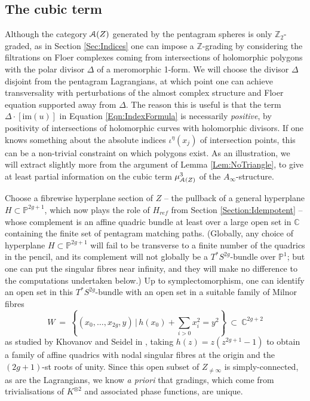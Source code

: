 \documentclass[reqno,10pt]{amsart}
\numberwithin{equation}{section}
\newcommand{\bC}{{\mathbb C}}
\newcommand{\bP}{{\mathbb P}}
\newcommand{\bZ}{{\mathbb Z}}
\newcommand{\scrA}{\EuScript{A}}
\newcommand{\im}{\mathrm{im}}
\theoremstyle{remark}
\begin{document}
\subsection{The cubic term\label{Sec:Cubic}}

 Although the category $\scrA(Z)$ generated by the pentagram spheres is only $\bZ_2$-graded, as in Section \ref{Sec:Indices} one can impose a $\bZ$-grading by considering the filtrations on Floer complexes coming from intersections of holomorphic polygons with the polar divisor $\Delta$ of a meromorphic 1-form.  We will choose the divisor $\Delta$ disjoint from the pentagram Lagrangians, at which point one can achieve transversality with perturbations of the almost complex structure and Floer equation supported away from $\Delta$.  The reason this is useful is that the term $\Delta \cdot [\im(u)]$ in Equation \ref{Eqn:IndexFormula} is necessarily \emph{positive}, by positivity of intersections of holomorphic curves with holomorphic divisors. If one knows something about the absolute indices $\iota^{\eta}(x_j)$ of intersection points, this can be a non-trivial constraint on which polygons exist.  As an illustration, we will extract slightly more from the argument of Lemma \ref{Lem:NoTriangle}, to give at least partial information on the cubic term $\mu^3_{\scrA(Z)}$ of the $A_{\infty}$-structure.
 
Choose a fibrewise hyperplane section of $Z$ -- the pullback of a general hyperplane $H\subset \bP^{2g+1}$, which now plays the role of $H_{ref}$ from Section \ref{Section:Idempotent}  -- whose complement is an affine quadric bundle at least over a large open set in $\bC$ containing the finite set of pentagram matching paths.  (Globally, any choice of hyperplane $H\subset \bP^{2g+1}$ will fail to be transverse to a finite number of the quadrics in the pencil, and its complement will not globally be a $T^*S^{2g}$-bundle over $\bP^1$; but one can put the singular fibres near infinity, and they will make no difference to the computations undertaken below.)  Up to symplectomorphism, one can identify an open set in this $T^*S^{2g}$-bundle with an open set in a suitable family of Milnor fibres 
\[
W \ = \ \left\{(x_0,\ldots,x_{2g},y) \, \big | \, h(x_0) + \sum_{i>0} x_i^2 =y^2 \right\} \ \subset \ \bC^{2g+2}
\]
as studied by Khovanov and Seidel in \cite{KhovanovSeidel}, taking $h(z) = z(z^{2g+1}-1)$ to obtain a family  of affine quadrics with nodal singular fibres at the origin and the $(2g+1)$-st roots of unity. Since this open subset of $Z_{\neq\infty}$ is simply-connected, as are the Lagrangians, we know \emph{a priori} that gradings, which come from trivialisations of $K^{\otimes 2}$ and associated phase functions, are unique.
\end{document}
